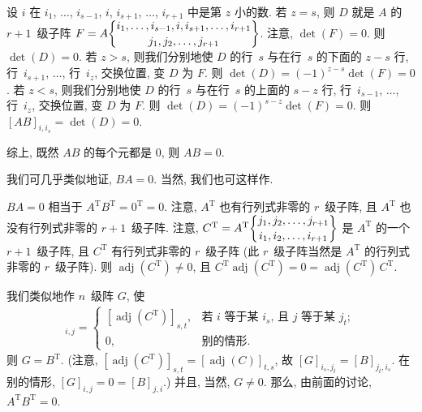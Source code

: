 \documentclass[../libro.tex]{subfiles}
\begin{document}
\begin{example}
    设 \(i\) 在
    \(i_1\), \(\dots\), \(i_{s-1}\), \(i\), \(i_{s+1}\), \(\dots\), \(i_{r+1}\)
    中是第 \(z\) 小的数.
    若 \(z = s\), 则 \(D\) 就是 \(A\) 的 \(r+1\)~级子阵
    \(F = A\submat{i_1,\dots,i_{s-1},i,i_{s+1},\dots,i_{r+1}}
    {j_1,j_2,\dots,j_{r+1}}\).
    注意, \(\det {(F)} = 0\).
    则 \(\det {(D)} = 0\).
    若 \(z > s\),
    则我们分别地使 \(D\) 的行~\(s\)
    与在行~\(s\) 的下面的 \(z - s\) 行,
    行~\(i_{s+1}\), \(\dots\), 行~\(i_z\),
    交换位置, 变 \(D\) 为 \(F\).
    则 \(\det {(D)} = (-1)^{z - s} \det {(F)} = 0\).
    若 \(z < s\),
    则我们分别地使 \(D\) 的行~\(s\)
    与在行~\(s\) 的上面的 \(s - z\) 行,
    行~\(i_{s-1}\), \(\dots\), 行~\(i_z\),
    交换位置, 变 \(D\) 为 \(F\).
    则 \(\det {(D)} = (-1)^{s - z} \det {(F)} = 0\).
    则 \([A B]_{i,i_s} = \det {(D)} = 0\).

    综上, 既然 \(A B\) 的每个元都是 \(0\), 则 \(A B = 0\).

    我们可几乎类似地证, \(B A = 0\).
    当然, 我们也可这样作.

    \(B A = 0\) 相当于
    \(A^{\mathrm{T}} B^{\mathrm{T}} = 0^{\mathrm{T}} = 0\).
    注意, \(A^{\mathrm{T}}\) 也有行列式非零的 \(r\)~级子阵,
    且 \(A^{\mathrm{T}}\) 也没有行列式非零的 \(r+1\)~级子阵.
    注意,
    \(C^{\mathrm{T}}
        = A^{\mathrm{T}}
    \submat{j_1,j_2,\dots,j_{r+1}}{i_1,i_2,\dots,i_{r+1}}\)
    是 \(A^{\mathrm{T}}\) 的一个 \(r+1\)~级子阵,
    且 \(C^{\mathrm{T}}\) 有行列式非零的 \(r\)~级子阵
    (此 \(r\)~级子阵当然是 \(A^{\mathrm{T}}\) 的行列式非零的 \(r\)~级子阵).
    则 \(\operatorname{adj} {(C^{\mathrm{T}})} \neq 0\),
    且 \(C^{\mathrm{T}} \operatorname{adj} {(C^{\mathrm{T}})} = 0
    = \operatorname{adj} {(C^{\mathrm{T}})}\, C^{\mathrm{T}}\).

    我们类似地作 \(n\)~级阵 \(G\), 使
    \begin{align*}
        [G]_{i,j} =
        \begin{cases}
            [\operatorname{adj} {(C^{\mathrm{T}})}]_{s,t},
            & \text{若 \(i\) 等于某 \(i_s\), 且 \(j\) 等于某 \(j_t\)};
            \\
            0,
            & \text{别的情形}.
        \end{cases}
    \end{align*}
    则 \(G = B^{\mathrm{T}}\).
    (注意, \([\operatorname{adj} {(C^{\mathrm{T}})}]_{s,t}
        = [\operatorname{adj} {(C)}]_{t,s}\),
        故 \([G]_{i_s,j_t} = [B]_{j_t,i_s}\).
    在别的情形, \([G]_{i,j} = 0 = [B]_{j,i}\).)
    并且, 当然, \(G \neq 0\).
    那么, 由前面的讨论, \(A^{\mathrm{T}} B^{\mathrm{T}} = 0\).
\end{example}
\end{document}
